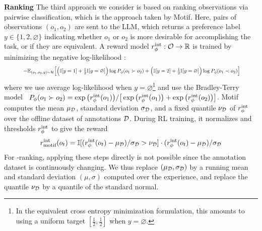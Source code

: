\textbf{Ranking} The third approach we consider is based on ranking observations via pairwise classification, which is the approach taken by Motif. Here, pairs of observations $(o_1, o_2)$ are sent to the LLM, which returns a preference label $y \in \{1, 2, \varnothing \}$ indicating whether $o_1$ or $o_2$ is more desirable for accomplishing the task, or if they are equivalent. 
A reward model $r^\mathrm{int}_\phi: \mathcal{O} \rightarrow \mathbb{R}$ is trained by minimizing the negative log-likelihood :
%
%
%
%
%
%
%
%
%
\begin{equation}
 \resizebox{0.9\columnwidth}{!}{
$\displaystyle - \mathbb{E}_{(o_1, o_2, y) \sim \H } \Big[ \Big(\mathbb{I}[y = 1] + \tfrac{1}{2} \mathbb{I}[y = \varnothing] \Big) \log P_\phi(o_1 \succ o_2) + 
  \Big(\mathbb{I}[y = 2] + \tfrac{1}{2} \mathbb{I}[y = \varnothing]\Big) \log P_\phi(o_1 \prec o_2) \Big]
$}
\end{equation}
where we use average log-likelihood when $y=\varnothing$\footnote{In the equivalent cross entropy minimization formulation, this amounts to using a uniform target $[\frac12, \frac12]$ when $y=\varnothing$.}
and use the Bradley-Terry model~\cite{bradley1952rank}
%
$P_\phi (o_1 \succ o_2) = \exp\big( r^\mathrm{int}_\phi(o_1)\big) / \big[  \exp\big({r^\mathrm{int}_\phi(o_1)}\big) + \exp\big( r^\mathrm{int}_\phi(o_2)\big) \big]$.
Motif computes the mean $\mu_{\mathcal{D}}$, standard deviation $\sigma_{\mathcal{D}}$, and a fixed quantile $\nu_{\mathcal{D}}$ of $r^\mathrm{int}_\phi$ over the offline dataset of annotations $\mathcal{D}$. During RL training, it normalizes and thresholds $r^\mathrm{int}_\phi$ to give the reward 
%
\begin{equation}
\label{eq:motif_thresholding}
 r^\mathrm{int}_\text{motif}(o_t) = \mathbb{I}[(r^\mathrm{int}_\phi(o_t) - \mu_{\mathcal{D}}) / \sigma_{\mathcal{D}} > \nu_{\mathcal{D}}] \cdot (r^\mathrm{int}_\phi(o_t) - \mu_{\mathcal{D}}) / \sigma_{\mathcal{D}}
\end{equation}
%
For \oni-ranking, applying these steps directly is not possible since the annotation dataset is continuously changing. 
We thus replace $(\mu_{\mathcal{D}}, \sigma_{\mathcal{D}})$ by a running mean and standard deviation $(\mu, \sigma)$ computed over the experience, and replace the quantile $\nu_{\mathcal{D}}$ by a quantile of the standard normal.

%
%
%
%
%
%
%
%
%


%
%
%
%
%
%
%
%
%
%
%



%
%
%
%
